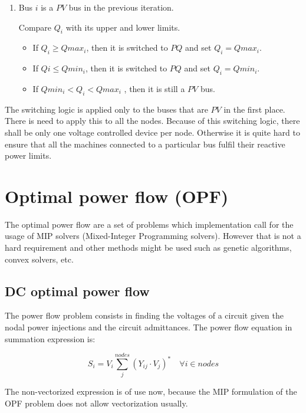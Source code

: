 \documentclass[nols,a4paper,twoside,notoc,fleqn]{tufte-book}
\begin{document}
\begin{enumerate}
	\item Bus $i$ is a $PV$ bus in the previous iteration.
	
	Compare $Q_i$ with its upper and lower limits.
	
	\begin{itemize}
		\item If $Q_i \geq Qmax_i$, then it is switched to $PQ$ and set $Q_i = Qmax_i$.
		\item If $Qi \leq Qmin_i$, then it is switched to $PQ$ and set $Q_i = Qmin_i$.
		\item If $Qmin_i < Q_i < Qmax_i$ , then it is still a $PV$ bus.
	\end{itemize}
\end{enumerate}

The switching logic is applied only to the buses that are $PV$ in the first place. There is need to apply this to all the nodes. Because of this switching logic, there shall be only one voltage controlled device per node. Otherwise it is quite hard to ensure that all the machines connected to a particular bus fulfil their reactive power limits.


\chapter{Optimal power flow (OPF)}

The optimal power flow are a set of problems which implementation call for the usage of MIP solvers (Mixed-Integer Programming solvers). However that is not a hard requirement and other methods might be used such as genetic algorithms, convex solvers, etc.


\section{DC optimal power flow}

The power flow problem consists in finding the voltages of a circuit given the nodal power injections and the circuit admittances. The power flow equation in summation expression is:

\begin{equation}
S_i=V_i \sum_j^{nodes} \left(Y_{ij} \cdot V_j\right) ^* \quad  \forall i \in nodes
\end{equation}

The non-vectorized expression is of use now, because the MIP formulation of the OPF problem does not allow vectorization usually.
\end{document}

